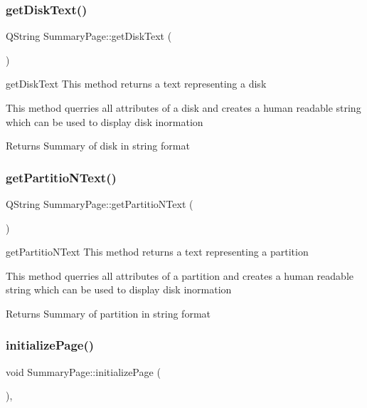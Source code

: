 \subsubsection{\texorpdfstring{get\+Disk\+Text()}{getDiskText()}}
{\footnotesize\ttfamily Q\+String Summary\+Page\+::get\+Disk\+Text (\begin{DoxyParamCaption}{ }\end{DoxyParamCaption})\hspace{0.3cm}{\ttfamily [private]}}



get\+Disk\+Text This method returns a text representing a disk 

This method querries all attributes of a disk and creates a human readable string which can be used to display disk inormation \begin{DoxyReturn}{Returns}
Summary of disk in string format 
\end{DoxyReturn}
\mbox{\label{class_summary_page_a0100c8e2a029708c5447c20c83bd7257}} 
\subsubsection{\texorpdfstring{get\+Partitio\+N\+Text()}{getPartitioNText()}}
{\footnotesize\ttfamily Q\+String Summary\+Page\+::get\+Partitio\+N\+Text (\begin{DoxyParamCaption}{ }\end{DoxyParamCaption})\hspace{0.3cm}{\ttfamily [private]}}



get\+Partitio\+N\+Text This method returns a text representing a partition 

This method querries all attributes of a partition and creates a human readable string which can be used to display disk inormation \begin{DoxyReturn}{Returns}
Summary of partition in string format 
\end{DoxyReturn}
\mbox{\label{class_summary_page_a987e9e51fef71237349acb3b47818737}} 
\subsubsection{\texorpdfstring{initialize\+Page()}{initializePage()}}
{\footnotesize\ttfamily void Summary\+Page\+::initialize\+Page (\begin{DoxyParamCaption}{ }\end{DoxyParamCaption})\hspace{0.3cm}{\ttfamily [override]}, {\ttfamily [protected]}}



